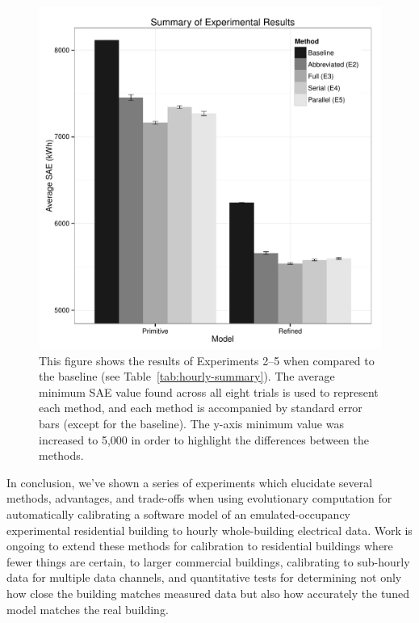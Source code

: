 \documentclass[preprint, review, 12pt]{elsarticle}
\begin{document}
\begin{figure}[htbp]
\centering
\includegraphics[width=5in]{figure3}
\caption{This figure shows the results of Experiments 2--5 when compared to the baseline (see Table~\ref{tab:hourly-summary}). The average minimum SAE value found across all eight trials is used to represent each method, and each method is accompanied by standard error bars (except for the baseline). The y-axis minimum value was increased to 5,000 in order to highlight the differences between the methods.}
\label{fig:hourly-summary}
\end{figure}

In conclusion, we've shown a series of experiments which elucidate several methods, advantages, and trade-offs when using evolutionary computation for automatically calibrating a software model of an emulated-occupancy experimental residential building to hourly whole-building electrical data. Work is ongoing to extend these methods for calibration to residential buildings where fewer things are certain, to larger commercial buildings, calibrating to sub-hourly data for multiple data channels, and quantitative tests for determining not only how close the building matches measured data but also how accurately the tuned model matches the real building.
\end{document}
